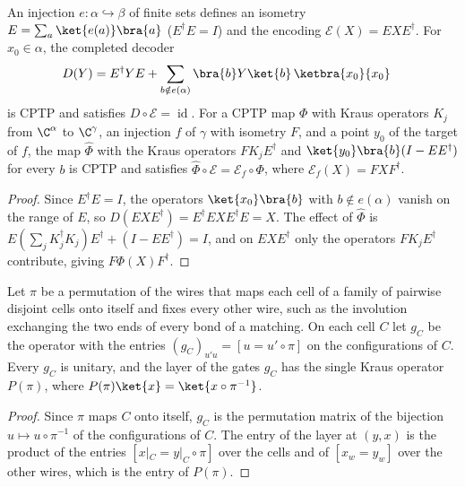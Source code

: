 \begin{lemma}
    \label{lem:qc_register_code_completion}
    \leanok
    An injection $e\colon\alpha\hookrightarrow\beta$ of finite sets defines an isometry $E=\sum_a\ket{e(a)}\bra{a}$ ($E^\dagger E=I$) and the encoding $\mathcal E(X)=EXE^\dagger$. For $x_0\in\alpha$, the completed decoder
    \begin{align}
        D(Y) & =E^\dagger YE+\sum_{b\notin e(\alpha)}\bra{b}Y\ket{b}\,\ketbra{x_0}{x_0}\notag
    \end{align}
    is CPTP and satisfies $D\circ\mathcal E=\operatorname{id}$. For a CPTP map $\Phi$ with Kraus operators $K_j$ from $\C^\alpha$ to $\C^\gamma$, an injection $f$ of $\gamma$ with isometry $F$, and a point $y_0$ of the target of $f$, the map $\widehat\Phi$ with the Kraus operators $FK_jE^\dagger$ and $\ket{y_0}\bra{b}(I-EE^\dagger)$ for every $b$ is CPTP and satisfies $\widehat\Phi\circ\mathcal E=\mathcal E_f\circ\Phi$, where $\mathcal E_f(X)=FXF^\dagger$.
\end{lemma}
\begin{proof}
    \leanok
    Since $E^\dagger E=I$, the operators $\ket{x_0}\bra{b}$ with $b\notin e(\alpha)$ vanish on the range of $E$, so $D(EXE^\dagger)=E^\dagger EXE^\dagger E=X$. The effect of $\widehat\Phi$ is $E(\sum_jK_j^\dagger K_j)E^\dagger+(I-EE^\dagger)=I$, and on $EXE^\dagger$ only the operators $FK_jE^\dagger$ contribute, giving $F\Phi(X)F^\dagger$.
\end{proof}

\begin{lemma}
    \label{lem:qc_port_matching_swaps}
    \leanok
    Let $\pi$ be a permutation of the wires that maps each cell of a family of pairwise disjoint cells onto itself and fixes every other wire, such as the involution exchanging the two ends of every bond of a matching. On each cell $C$ let $g_C$ be the operator with the entries $(g_C)_{u'u}=[u=u'\circ\pi]$ on the configurations of $C$. Every $g_C$ is unitary, and the layer of the gates $g_C$ has the single Kraus operator $P(\pi)$, where $P(\pi)\ket{x}=\ket{x\circ\pi^{-1}}$.
\end{lemma}
\begin{proof}
    \leanok
    Since $\pi$ maps $C$ onto itself, $g_C$ is the permutation matrix of the bijection $u\mapsto u\circ\pi^{-1}$ of the configurations of $C$. The entry of the layer at $(y,x)$ is the product of the entries $[x|_C=y|_C\circ\pi]$ over the cells and of $[x_w=y_w]$ over the other wires, which is the entry of $P(\pi)$.
\end{proof}

